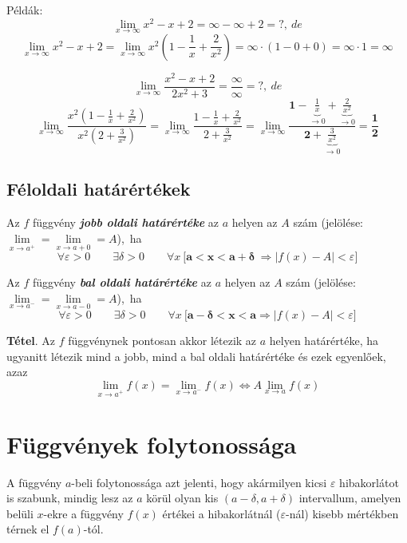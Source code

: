 \documentclass[tikz,12pt,margin=0px]{article}
\newcommand\ddfrac[2]{\frac{\displaystyle #1}{\displaystyle #2}}
\begin{document}
    \noindent Példák:
    \[
        \lim\limits_{x \to \infty}x^{2} - x + 2 = \infty -\infty + 2 = ?,\ de
    \]
    \[
        \lim\limits_{x \to \infty}x^{2} - x + 2 = \lim\limits_{x \to \infty}x^{2}(1 - \ddfrac{1}{x} + \ddfrac{2}{x^{2}}) = \infty \cdot (1 - 0 + 0) = \infty \cdot 1 = \infty
    \]

    \[
        \lim\limits_{x \to \infty}\ddfrac{x^{2} - x + 2}{2x^{2}+3} = \ddfrac{\infty}{\infty} = ?,\ de
    \]
    \[
        \lim\limits_{x \to \infty}\ddfrac{x^{2}(1 - \ddfrac{1}{x} + \ddfrac{2}{x^{2}})}{x^{2}(2+\ddfrac{3}{x^{2}})} = \lim\limits_{x \to \infty}\ddfrac{1 - \ddfrac{1}{x} + \ddfrac{2}{x^{2}}}{2+\ddfrac{3}{x^{2}}} = \lim\limits_{x \to \infty}\ddfrac{\textbf{1} - \underbrace{\ddfrac{1}{x}}_{\rightarrow 0} + \underbrace{\ddfrac{2}{x^{2}}}_{\rightarrow 0}}{\textbf{2}+\underbrace{\ddfrac{3}{x^{2}}}_{\rightarrow 0}} = \ddfrac{\textbf{1}}{\textbf{2}}
    \]

    \subsection*{Féloldali határértékek}

    \noindent Az $f$ függvény \textbf{\emph{jobb oldali határértéke}} az $a$ helyen az $A$ szám (jelölése: $\lim\limits_{x \to a^{+}} = \lim\limits_{x \to a+0} = A$),\ ha
    \[
        \forall \varepsilon > 0\qquad \exists \delta > 0\qquad \forall x\ \Big[\boldsymbol{a < x < a + \delta}\ \Rightarrow \big|f(x) - A\big| < \varepsilon\Big]
    \]

    \noindent Az $f$ függvény \textbf{\emph{bal oldali határértéke}} az $a$ helyen az $A$ szám (jelölése: $\lim\limits_{x \to a^{-}} = \lim\limits_{x \to a-0} = A$),\ ha
    \[
        \forall \varepsilon > 0\qquad \exists \delta > 0\qquad \forall x\ \Big[\boldsymbol{a - \delta < x < a} \Rightarrow \big|f(x) - A\big| < \varepsilon\Big]
    \]

    \noindent \textbf{Tétel}. Az $f$ függvénynek pontosan akkor létezik az $a$ helyen határértéke, ha ugyanitt létezik mind a jobb, mind a bal oldali határértéke és ezek egyenlőek, azaz
    \[
        \lim\limits_{x \to a^{+}}f(x) = \lim\limits_{x \to a^{-}}f(x)
        \Leftrightarrow
        A \lim\limits_{x \to a}f(x)
    \]

	\section*{Függvények folytonossága}

    \noindent A függvény $a$-beli folytonossága azt jelenti, hogy akármilyen kicsi $\varepsilon$ hibakorlátot is szabunk, mindig lesz az $a$ körül olyan kis $( a-\delta, a+\delta )$ intervallum, amelyen belüli $x$-ekre a függvény $f(x)$ értékei a hibakorlátnál ($\varepsilon$-nál) kisebb mértékben térnek el $f(a)$-tól.\\
	
\end{document}
